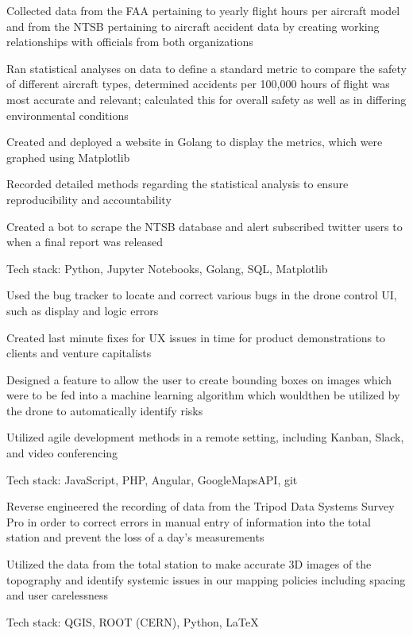 \documentclass[letterpaper]{resume}
\begin{document}
\begin{compactitem}
\item Collected data from the FAA pertaining to yearly flight hours per aircraft model and from the NTSB pertaining to aircraft accident data by creating working relationships with officials from both organizations
\item Ran statistical analyses on data to define a standard metric to compare the safety of different aircraft types, determined accidents per 100,000 hours of flight was most accurate and relevant; calculated this for overall safety as well as in differing environmental conditions
\item Created and deployed a website in Golang to display the metrics, which were graphed using Matplotlib
\item Recorded detailed methods regarding the statistical analysis to ensure reproducibility and accountability
\item Created a bot to scrape the NTSB database and alert subscribed twitter users to when a final report was released
\item Tech stack: Python, Jupyter Notebooks, Golang, SQL, Matplotlib
\end{compactitem}

\begin{compactitem}
\item Used the bug tracker to locate and correct various bugs in the drone control UI, such as display and logic errors
\item Created last minute fixes for UX issues in time for product demonstrations to clients and venture capitalists
\item Designed a feature to allow the user to create bounding boxes on images which were to be fed into a machine learning algorithm which wouldthen be utilized by the drone to automatically identify risks
\item Utilized agile development methods in a remote setting, including Kanban, Slack, and video conferencing
\item Tech stack: JavaScript, PHP, Angular, GoogleMapsAPI, git
\end{compactitem}

\begin{compactitem}
\item Reverse engineered the recording of data from the Tripod Data Systems Survey Pro in order to correct errors in manual entry of information into the total station and prevent the loss of a day's measurements
\item Utilized the data from the total station to make accurate 3D images of the topography and identify systemic issues in our mapping policies including spacing and user carelessness
\item Tech stack: QGIS, ROOT (CERN), Python, LaTeX
\end{compactitem}
\end{document}
